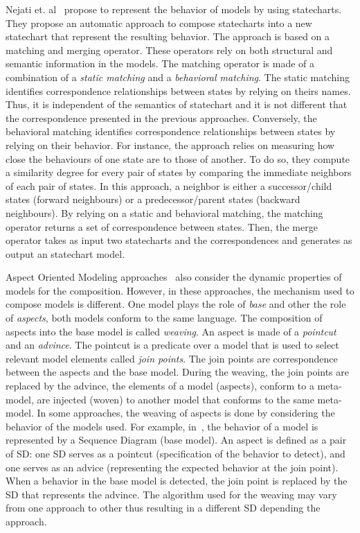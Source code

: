 Nejati et. al~\cite{compostatechartsbib} propose to represent the behavior of models by using statecharts. They propose an automatic approach to compose statecharts into a new statechart that represent the resulting behavior. The approach is based on a matching and merging operator. These operators rely on both structural and semantic information in the models. The matching operator is made of a combination of a \emph{static matching} and a \emph{behavioral matching}. The static matching identifies correspondence relationships between states by relying on theirs names. Thus, it is independent of the semantics of statechart and it is not different that the correspondence presented in the previous approaches. Conversely, the behavioral matching identifies correspondence relationships between states by relying on their behavior. For instance, the approach relies on measuring how close the behaviours of one state are to those of another. To do so, they compute a similarity degree for every pair of states by comparing the immediate neighbors of each pair of states. In this approach, a neighbor is either a successor/child states (forward neighbours) or a predecessor/parent states (backward neighbours). By relying on a static and behavioral matching, the matching operator returns a set of correspondence between states. Then, the merge operator takes as input two statecharts and the correspondences and generates as output an statechart model.
       
Aspect Oriented Modeling approaches~\cite{weavingbib} also consider the dynamic properties of models for the composition. However, in these approaches, the mechanism used to compose models is different. One model plays the role of \emph{base} and other the role of \emph{aspects}, both models conform to the same language. The composition of aspects into the base model is called \emph{weaving}. An aspect is made of a \emph{pointcut} and an \emph{advince}. The pointcut is a predicate over a model that is used to select relevant model elements called \emph{join points}. The join points are correspondence between the aspects and the base model. During the weaving, the join points are replaced by the advince, \ie the elements of a model (aspects), conform to a meta-model, are injected (woven) to another model that conforms to the same meta-model. In some approaches, the weaving of aspects is done by considering the behavior of the models used. For example, in~\cite{sequenceweavingbib,rambib,composdbib}, the behavior of a model is represented by a Sequence Diagram (base model). An aspect is defined as a pair of SD: one SD serves as a pointcut (specification of the behavior to detect), and one serves as an advice (representing the expected behavior at the join point). When a behavior in the base model is detected, the join point is replaced by the SD that represents the advince. The algorithm used for the weaving may vary from one approach to other thus resulting in a different SD depending the approach. 

